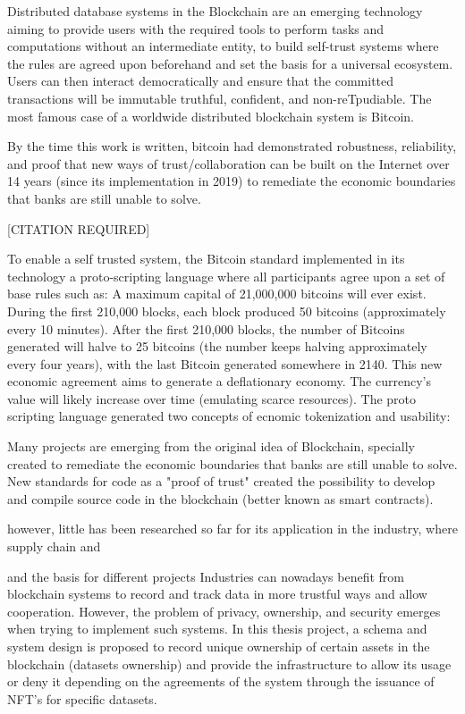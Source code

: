 
\abstract
Distributed database systems in the Blockchain are an emerging technology aiming to provide users with the required tools to perform tasks and computations without an intermediate entity, to build self-trust systems where the rules are agreed upon beforehand and set the basis for a universal ecosystem. Users can then interact democratically and ensure that the committed transactions will be immutable truthful, confident, and non-reTpudiable.
The most famous case of a worldwide distributed blockchain system is Bitcoin. 

By the time this work is written, bitcoin had demonstrated robustness, reliability, and proof that new ways of trust/collaboration can be built on the Internet over 14 years (since its implementation in 2019) to remediate the economic boundaries that banks are still unable to solve.

[CITATION REQUIRED] 


To enable a self trusted system, the Bitcoin standard implemented in its technology a proto-scripting language where all participants agree upon a set of base rules such as:
A maximum capital of 21,000,000 bitcoins will ever exist.
During the first 210,000 blocks, each block produced 50 bitcoins (approximately every 10 minutes).
After the first 210,000 blocks, the number of Bitcoins generated will halve to 25 bitcoins (the number keeps halving approximately every four years), with the last Bitcoin generated somewhere in 2140.
This new economic agreement aims to generate a deflationary economy. The currency's value will likely increase over time (emulating scarce resources). 
The proto scripting language generated two concepts of ecnomic tokenization and usability:

Many projects are emerging from the original idea of Blockchain, specially created to remediate the economic boundaries that banks are still unable to solve. New standards for code as a "proof of trust" created the possibility to develop and compile source code in the blockchain (better known as smart contracts). 

 however, little has been researched so far for its application in the industry, where supply chain and 

  and the basis for different projects 
Industries can nowadays benefit from blockchain systems to record and track data in more trustful ways and allow cooperation. However, the problem of privacy, ownership, and security emerges when trying to implement such systems. In this thesis project, a schema and system design is proposed to record unique ownership of certain assets in the blockchain (datasets ownership) and provide the infrastructure to allow its usage or deny it depending on the agreements of the system through the issuance of NFT's for specific datasets.


